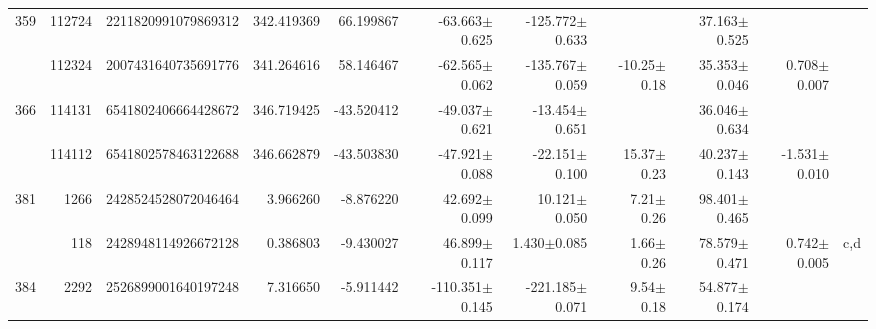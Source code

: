 \documentclass{ws-ijmpd}
\begin{document}
\begin{landscape}
\begin{longtable}{rrrrrrrrrrl}
 \hline 359 &  112724 &      2211820991079869312 &                   342.419369 &                    66.199867 &                -63.663$\pm$0.625 &               -125.772$\pm$0.633 &                           &        37.163$\pm$0.525 &                                           &                                                    \\
            &  112324 &      2007431640735691776 &                   341.264616 &                    58.146467 &                -62.565$\pm$0.062 &               -135.767$\pm$0.059 &         -10.25$\pm$  0.18 &        35.353$\pm$0.046 &                           0.708$\pm$0.007 &                                                    \\
 \hline 366 &  114131 &      6541802406664428672 &                   346.719425 &                   -43.520412 &                -49.037$\pm$0.621 &                -13.454$\pm$0.651 &                           &        36.046$\pm$0.634 &                                           &                                                    \\
            &  114112 &      6541802578463122688 &                   346.662879 &                   -43.503830 &                -47.921$\pm$0.088 &                -22.151$\pm$0.100 &          15.37$\pm$  0.23 &        40.237$\pm$0.143 &                          -1.531$\pm$0.010 &                                                    \\
 \hline 381 &    1266 &      2428524528072046464 &                     3.966260 &                    -8.876220 &                 42.692$\pm$0.099 &                 10.121$\pm$0.050 &           7.21$\pm$  0.26 &        98.401$\pm$0.465 &                                           &                                                    \\
            &     118 &      2428948114926672128 &                     0.386803 &                    -9.430027 &                 46.899$\pm$0.117 &                  1.430$\pm$0.085 &           1.66$\pm$  0.26 &        78.579$\pm$0.471 &                           0.742$\pm$0.005 &                                                c,d \\
 \hline 384 &    2292 &      2526899001640197248 &                     7.316650 &                    -5.911442 &               -110.351$\pm$0.145 &               -221.185$\pm$0.071 &           9.54$\pm$  0.18 &        54.877$\pm$0.174 &                                           &                                                    \\

\end{longtable}
\end{landscape}
\end{document}
